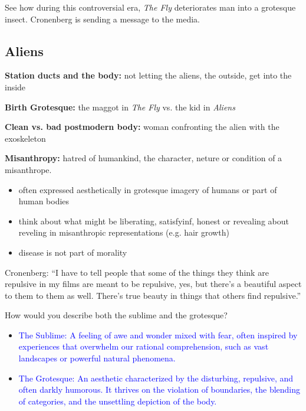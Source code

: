 \documentclass[11pt,fleqn]{book}
\begin{document}
\begin{remark}
    See how during this controversial era, \textit{The Fly} deteriorates man into a grotesque insect. Cronenberg is sending a message to the media.
\end{remark}

\subsection{Aliens}
\textbf{Station ducts and the body:} not letting the aliens, the outside, get into the inside


\textbf{Birth Grotesque:} the maggot in \textit{The Fly} vs. the kid in \textit{Aliens}

\textbf{Clean vs. bad postmodern body:} woman confronting the alien with the exoskeleton

\textbf{Misanthropy:} hatred of humankind, the character, neture or condition of a misanthrope.
\begin{itemize}
    \item often expressed aesthetically in grotesque imagery of humans or part of human bodies
    \item think about what might be liberating, satisfyinf, honest or revealing about reveling in misanthropic representations (e.g. hair growth)
    \item disease is not part of morality
\end{itemize}

Cronenberg: \enquote{I have to tell people
that some of the things
they think are repulsive
in my films are meant to
be repulsive, yes, but
there’s a beautiful
aspect to them to them
as well. There’s true
beauty in things that
others find repulsive.}

\begin{exercise}
How would you describe both the sublime and the grotesque?
\begin{itemize}
\item \textcolor{blue}{The Sublime:  A feeling of awe and wonder mixed with fear, often inspired by experiences that overwhelm our rational comprehension, such as vast landscapes or powerful natural phenomena.}
\item \textcolor{blue}{The Grotesque: An aesthetic characterized by the disturbing, repulsive, and often darkly humorous. It thrives on the violation of boundaries, the blending of categories, and the unsettling  depiction of the body.}
\end{itemize}
\end{exercise}
\end{document}
